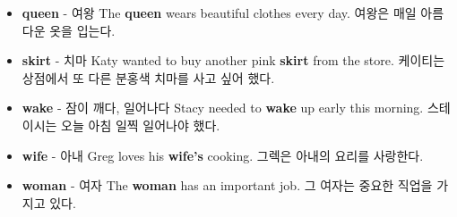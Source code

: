 \documentclass{article}
\begin{document}
\begin{addmargin}[1em]{1em}
\begin{itemize}
        \item \fontsize{12pt}{14pt}\selectfont \textbf{queen} - 여왕 \newline
        The \textbf{queen} wears beautiful clothes every day. \newline
        여왕은 매일 아름다운 옷을 입는다.
        
        \item \fontsize{12pt}{14pt}\selectfont \textbf{skirt} - 치마 \newline
        Katy wanted to buy another pink \textbf{skirt} from the store. \newline
        케이티는 상점에서 또 다른 분홍색 치마를 사고 싶어 했다.
        
        \item \fontsize{12pt}{14pt}\selectfont \textbf{wake} - 잠이 깨다, 일어나다 \newline
        Stacy needed to \textbf{wake} up early this morning. \newline
        스테이시는 오늘 아침 일찍 일어나야 했다.
        
        \item \fontsize{12pt}{14pt}\selectfont \textbf{wife} - 아내 \newline
        Greg loves his \textbf{wife's} cooking. \newline
        그렉은 아내의 요리를 사랑한다.
        
        \item \fontsize{12pt}{14pt}\selectfont \textbf{woman} - 여자 \newline
        The \textbf{woman} has an important job. \newline
        그 여자는 중요한 직업을 가지고 있다.
    \end{itemize}
\end{addmargin}

\newpage

\end{document}
